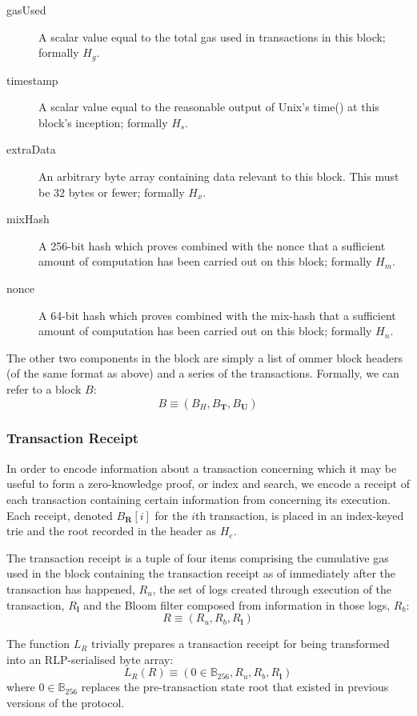 \documentclass[9pt,oneside]{amsart}
\begin{document}
\begin{multicols}{2}
\begin{description}
\item[gasUsed] A scalar value equal to the total gas used in transactions in this block; formally $H_g$.
\item[timestamp] A scalar value equal to the reasonable output of Unix's time() at this block's inception; formally $H_s$.
\item[extraData] An arbitrary byte array containing data relevant to this block. This must be 32 bytes or fewer; formally $H_x$.
\item[mixHash] A 256-bit hash which proves combined with the nonce that a sufficient amount of computation has been carried out on this block; formally $H_m$.
\item[nonce] A 64-bit hash which proves combined with the mix-hash that a sufficient amount of computation has been carried out on this block; formally $H_n$.
\end{description}

The other two components in the block are simply a list of ommer block headers (of the same format as above) and a series of the transactions. Formally, we can refer to a block $B$:
\begin{equation}
B \equiv (B_H, B_\mathbf{T}, B_\mathbf{U})
\end{equation}

\subsubsection{Transaction Receipt}

In order to encode information about a transaction concerning which it may be useful to form a zero-knowledge proof, or index and search, we encode a receipt of each transaction containing certain information from concerning its execution.
Each receipt, denoted $B_\mathbf{R}[i]$ for the $i$th transaction, is placed in an index-keyed trie and the root recorded in the header as $H_e$.

The transaction receipt is a tuple of four items comprising the cumulative gas used in the block containing the transaction receipt as of immediately after the transaction has happened, $R_u$, the set of logs created through execution of the transaction, $R_\mathbf{l}$ and the Bloom filter composed from information in those logs, $R_b$:
\begin{equation}
R \equiv (R_u, R_b, R_\mathbf{l})
\end{equation}

The function $L_R$ trivially prepares a transaction receipt for being transformed into an RLP-serialised byte array:
\begin{equation}
L_R(R) \equiv (0 \in \mathbb{B}_{256}, R_u, R_b, R_\mathbf{l})
\end{equation}
where $0 \in \mathbb{B}_{256}$ replaces the pre-transaction state root that existed in previous versions of the protocol.


\end{multicols}
\end{document}
